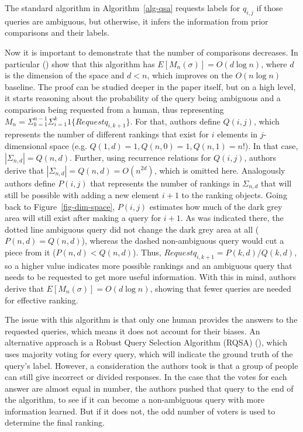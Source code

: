 \documentclass[
  letterpaper,
  numbers=noenddot,
  DIV=11,
  oneside]{scrreprt}
\theoremstyle{remark}
\begin{document}
The standard algorithm in  Algorithm~\ref{alg-qsa}  requests labels for
\(q_{i,j}\) if those queries are ambiguous, but otherwise, it infers the
information from prior comparisons and their labels.

Now it is important to demonstrate that the number of comparisons
decreases. In particular ()
show that this algorithm has \(E[M_n(\sigma)] = O(d\log n)\), where
\(d\) is the dimension of the space and \(d < n\), which improves on the
\(O(n\log n)\) baseline. The proof can be studied deeper in the paper
itself, but on a high level, it starts reasoning about the probability
of the query being ambiguous and a comparison being requested from a
human, thus representing
\(M_n = \Sigma_{k=1}^{n-1}\Sigma_{i=1}^k 1\{Requestq_{i,k+1}\}\). For
that, authors define \(Q(i,j)\), which represents the number of
different rankings that exist for \(i\) elements in \(j\)-dimensional
space (e.g. \(Q(1,d) = 1, Q(n,0) = 1, Q(n,1) = n!\)). In that case,
\(|\Sigma_{n,d}| = Q(n,d)\). Further, using recurrence relations for
\(Q(i,j)\), authors derive that \(|\Sigma_{n,d}| = Q(n,d) = O(n^{2d})\),
which is omitted here. Analogously authors define \(P(i,j)\) that
represents the number of rankings in \(\Sigma_{n,d}\) that will still be
possible with adding a new element \(i+1\) to the ranking objects. Going
back to Figure~\ref{fig-dim-space}, \(P(i,j)\) estimates how much of the
dark grey area will still exist after making a query for \(i+1\). As was
indicated there, the dotted line ambiguous query did not change the dark
grey area at all (\(P(n,d) = Q(n,d)\)), whereas the dashed non-ambiguous
query would cut a piece from it (\(P(n,d) < Q(n,d)\)). Thus,
\(Request q_{i,k+1} = P(k,d) / Q(k,d)\), so a higher value indicates
more possible rankings and an ambiguous query that needs to be requested
to get more useful information. With this in mind, authors derive that
\(E[M_n(\sigma)] = O(d\log n)\), showing that fewer queries are needed
for effective ranking.

The issue with this algorithm is that only one human provides the
answers to the requested queries, which means it does not account for
their biases. An alternative approach is a Robust Query Selection
Algorithm (RQSA) (), which
uses majority voting for every query, which will indicate the ground
truth of the query's label. However, a consideration the authors took is
that a group of people can still give incorrect or divided responses. In
the case that the votes for each answer are almost equal in number, the
authors pushed that query to the end of the algorithm, to see if it can
become a non-ambiguous query with more information learned. But if it
does not, the odd number of voters is used to determine the final
ranking.
\end{document}

